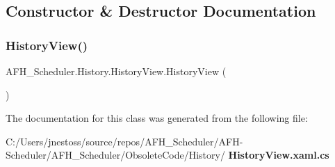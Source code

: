 \subsection{Constructor \& Destructor Documentation}
\mbox{\label{class_a_f_h___scheduler_1_1_history_1_1_history_view_a3990399f4ee8be93b69f5a85699a7c38}} 
\subsubsection{HistoryView()}
{\footnotesize\ttfamily A\+F\+H\+\_\+\+Scheduler.\+History.\+History\+View.\+History\+View (\begin{DoxyParamCaption}{ }\end{DoxyParamCaption})}



The documentation for this class was generated from the following file\+:\begin{DoxyCompactItemize}
\item 
C\+:/\+Users/jnestoss/source/repos/\+A\+F\+H\+\_\+\+Scheduler/\+A\+F\+H-\/\+Scheduler/\+A\+F\+H\+\_\+\+Scheduler/\+Obsolete\+Code/\+History/\textbf{ History\+View.\+xaml.\+cs}\end{DoxyCompactItemize}
